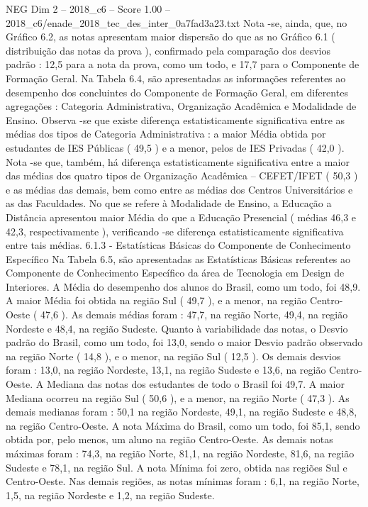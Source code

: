 \begin{textsample}{NEG Dim 2 – 2018\_c6 – Score 1.00 – 2018\_c6/enade\_2018\_tec\_des\_inter\_0a7fad3a23.txt}
Nota -se, ainda, que, no Gráfico 6.2, as notas apresentam maior dispersão do que as no Gráfico 6.1 ( distribuição das notas da prova ), confirmado pela comparação dos desvios padrão : 12,5 para a nota da prova, como um todo, e 17,7 para o Componente de Formação Geral.
Na Tabela 6.4, são apresentadas as informações referentes ao desempenho dos concluintes do Componente de Formação Geral, em diferentes agregações : Categoria Administrativa, Organização Acadêmica e Modalidade de Ensino.
Observa -se que existe diferença estatisticamente significativa entre as médias dos tipos de Categoria Administrativa : a maior Média obtida por estudantes de IES Públicas ( 49,5 ) e a menor, pelos de IES Privadas ( 42,0 ).
Nota -se que, também, há diferença estatisticamente significativa entre a maior das médias dos quatro tipos de Organização Acadêmica – CEFET/IFET ( 50,3 ) e as médias das demais, bem como entre as médias dos Centros Universitários e as das Faculdades.
No que se refere à Modalidade de Ensino, a Educação a Distância apresentou maior Média do que a Educação Presencial ( médias 46,3 e 42,3, respectivamente ), verificando -se diferença estatisticamente significativa entre tais médias. 6.1.3 - Estatísticas Básicas do Componente de Conhecimento Específico Na Tabela 6.5, são apresentadas as Estatísticas Básicas referentes ao Componente de Conhecimento Específico da área de Tecnologia em Design de Interiores.
A Média do desempenho dos alunos do Brasil, como um todo, foi 48,9.
A maior Média foi obtida na região Sul ( 49,7 ), e a menor, na região Centro-Oeste ( 47,6 ).
As demais médias foram : 47,7, na região Norte, 49,4, na região Nordeste e 48,4, na região Sudeste.
Quanto à variabilidade das notas, o Desvio padrão do Brasil, como um todo, foi 13,0, sendo o maior Desvio padrão observado na região Norte ( 14,8 ), e o menor, na região Sul ( 12,5 ).
Os demais desvios foram : 13,0, na região Nordeste, 13,1, na região Sudeste e 13,6, na região Centro-Oeste.
A Mediana das notas dos estudantes de todo o Brasil foi 49,7.
A maior Mediana ocorreu na região Sul ( 50,6 ), e a menor, na região Norte ( 47,3 ).
As demais medianas foram : 50,1 na região Nordeste, 49,1, na região Sudeste e 48,8, na região Centro-Oeste.
A nota Máxima do Brasil, como um todo, foi 85,1, sendo obtida por, pelo menos, um aluno na região Centro-Oeste.
As demais notas máximas foram : 74,3, na região Norte, 81,1, na região Nordeste, 81,6, na região Sudeste e 78,1, na região Sul.
A nota Mínima foi zero, obtida nas regiões Sul e Centro-Oeste.
Nas demais regiões, as notas mínimas foram : 6,1, na região Norte, 1,5, na região Nordeste e 1,2, na região Sudeste.

\end{textsample}
